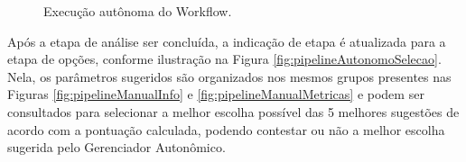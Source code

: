 \documentclass[portugues]{ic-tese}
\begin{document}
\begin{figure}[H]
    \centering
    \caption{Execução autônoma do Workflow.}
    \label{fig:pipelineAutonomo}
\end{figure}

Após a etapa de análise ser concluída, a indicação de etapa é atualizada para a etapa de opções, conforme ilustração na Figura \ref{fig:pipelineAutonomoSelecao}. Nela, os parâmetros sugeridos são organizados nos mesmos grupos presentes nas Figuras \ref{fig:pipelineManualInfo} e \ref{fig:pipelineManualMetricas} e podem ser consultados para selecionar a melhor escolha possível das 5 melhores sugestões de acordo com a pontuação calculada, podendo contestar ou não a melhor escolha sugerida pelo Gerenciador Autonômico.
\end{document}
